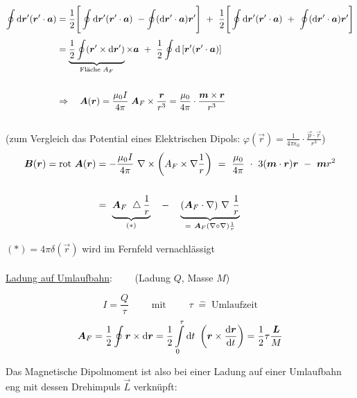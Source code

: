 \begin{align*}
\Oint{}{}{\vec{r}'} (\vec{r}'\cdot\vec{a}) &= \frac{1}{2}\Bigg[\Oint{}{}{\vec{r}'}(\vec{r}'\cdot\vec{a}) \ - \oint(\mathrm{d}\vec{r}'\cdot\vec{a})\vec{r}'\Bigg] \ + \ \frac{1}{2} \Bigg[\Oint{}{}{\vec{r}'}(\vec{r}'\cdot\vec{a}) \ + \ \oint(\mathrm{d}\vec{r}'\cdot\vec{a})\vec{r}'\Bigg]\\
&= \underbrace{\frac{1}{2}\oint(\vec{r}'\times\mathrm{d}\vec{r}')}_{\text{Fläche }A_F} \times\vec{a} \ + \ \frac{1}{2} \oint\mathrm{d}\left[\vec{r}'(\vec{r}'\cdot\vec{a})\right]\\ 
\ \\
& \Rightarrow \quad \vec{A}(\vec{r}) = \frac{\mu_0 I }{4\pi} \; \vec{A}_F\times\frac{\vec{r}}{r^3} = \frac{\mu_0}{4\pi} \cdot \frac{\vec{m}\times\vec{r}}{r^3}
\end{align*}
\ \\
(zum Vergleich das Potential eines Elektrischen Dipols: $\varphi(\vec{r}) = \frac{1}{4\pi\epsilon_0} \cdot \frac{\vec{p}\cdot\vec{r}}{r^3}$)
\ \\
\begin{align*}
\vec{B}(\vec{r}) = \rot\vec{A}(\vec{r}) &= - \frac{\mu_0 I}{4\pi} \ \nabla \times \left(A_F\times\nabla\frac{1}{r}\right) \ = \ \frac{\mu_0}{4\pi} \ \cdot \ 3(\vec{m}\cdot\vec{r})\vec{r} \ - \ \vec{m}r^2\\
\ \\
&= \ \underbrace{\vec{A}_F \ \bigtriangleup\frac{1}{r}}_{(*)} \quad - \quad \underbrace{(\vec{A}_F
\cdot\nabla)\ \nabla \ \frac{1}{r}}_{= \ \vec{A}_F (\nabla \circ \nabla) \frac{1}{r}}
\end{align*}

$(*) = 4\pi\delta(\vec{r})$ wird im Fernfeld vernachlässigt
\ \\
\ \\
\underline{Ladung auf Umlaufbahn}:$\qquad$ (Ladung $Q$, Masse $M$)

\begin{equation*}
I = \frac{Q}{\tau} \qquad \text{ mit } \qquad \tau \; \hat{=} \; \text{Umlaufzeit}
\end{equation*}
\begin{equation*}
\vec{A}_F = \frac{1}{2}\oint\vec{r}\times\mathrm{d}\vec{r} = \frac{1}{2}\Int{0}{\tau}{t} \ \left(\vec{r}\times\diff{\vec{r}}{t}\right) =\frac{1}{2}\tau \frac{\vec{L}}{M}
\end{equation*}

Das Magnetische Dipolmoment ist also bei einer Ladung auf einer Umlaufbahn eng mit dessen Drehimpuls $\vec{L}$ verknüpft:

